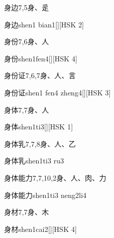 \begin{entry}{身边}{7,5}{⾝、⾡}
  \begin{phonetics}{身边}{shen1 bian1}[][HSK 2]
  \end{phonetics}
\end{entry}

\begin{entry}{身份}{7,6}{⾝、⼈}
  \begin{phonetics}{身份}{shen1fen4}[][HSK 4]
  \end{phonetics}
\end{entry}

\begin{entry}{身份证}{7,6,7}{⾝、⼈、⾔}
  \begin{phonetics}{身份证}{shen1 fen4 zheng4}[][HSK 3]
  \end{phonetics}
\end{entry}

\begin{entry}{身体}{7,7}{⾝、⼈}
  \begin{phonetics}{身体}{shen1ti3}[][HSK 1]
  \end{phonetics}
\end{entry}

\begin{entry}{身体乳}{7,7,8}{⾝、⼈、⼄}
  \begin{phonetics}{身体乳}{shen1ti3 ru3}
  \end{phonetics}
\end{entry}

\begin{entry}{身体能力}{7,7,10,2}{⾝、⼈、⾁、⼒}
  \begin{phonetics}{身体能力}{shen1ti3 neng2li4}
  \end{phonetics}
\end{entry}

\begin{entry}{身材}{7,7}{⾝、⽊}
  \begin{phonetics}{身材}{shen1cai2}[][HSK 4]
  \end{phonetics}
\end{entry}

